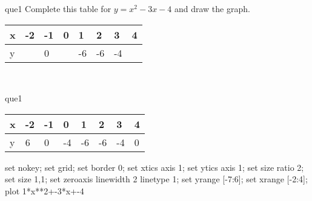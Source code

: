 \documentclass[13.5pt, varwidth=true]{beamer}
\begin{document}
\begin{frame}[shrink=19,fragile]
	\begin{beamercolorbox}[rounded=true, left, shadow=true,wd=14.8cm]{que1}
		 Complete this table for $y = x^{2} - 3x - 4$ and draw the graph. \\[0.3cm] \renewcommand{\arraystretch}{1.2}\begin{tabular}{|C|C|C|C|C|C|C|C|} \hline x & -2 & -1 & 0 & 1 & 2 & 3 & 4 \\ \hline y &  & 0 &  & -6 & -6 & -4 & \\ \hline \end{tabular}\\[0.3cm]
	\end{beamercolorbox}
\end{frame}
\begin{frame}[shrink=19,fragile]
	\begin{beamercolorbox}[rounded=true, left, shadow=true,wd=14.8cm]{que1}
		\renewcommand{\arraystretch}{1.2}\begin{tabular}{|C|C|C|C|C|C|C|C|} \hline x & -2 & -1 & 0 & 1 & 2 & 3 & 4 \\ \hline y & 6 & 0 & -4 & -6 & -6 & -4 & 0\\ \hline \end{tabular}\begin{gnuplot}[terminal=pdf] set nokey; set grid; set border 0; set xtics axis 1; set ytics axis 1; set size ratio 2; set size 1,1; set zeroaxis linewidth 2 linetype 1; set yrange [-7:6]; set xrange [-2:4]; plot 1*x**2+-3*x+-4 \end{gnuplot}
	\end{beamercolorbox}
\end{frame}
\end{document}

